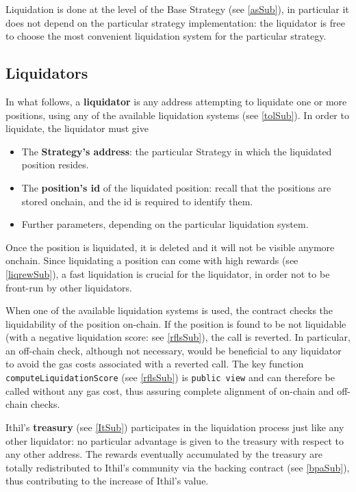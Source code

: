 \documentclass[a4paper,10 pt]{article}
\theoremstyle{definition}
\begin{document}
Liquidation is done at the level of the Base Strategy (see \ref{asSub}), in particular it does not depend on the particular strategy implementation: the liquidator is free to choose the most convenient liquidation system for the particular strategy.

\subsection{Liquidators}\label{liqSub}
In what follows, a {\bf liquidator} is any address attempting to liquidate one or more positions, using any of the available liquidation systems (see \ref{tolSub}). In order to liquidate, the liquidator must give
\begin{itemize}
\item The {\bf Strategy's address}: the particular Strategy in which the liquidated position resides.
\item The {\bf position's id} of the liquidated position: recall that the positions are stored onchain, and the id is required to identify them.
\item Further parameters, depending on the particular liquidation system.
\end{itemize}

Once the position is liquidated, it is deleted and it will not be visible anymore onchain. Since liquidating a position can come with high rewards (see \ref{liqrewSub}), a fast liquidation is crucial for the liquidator, in order not to be front-run by other liquidators.

When one of the available liquidation systems is used, the contract checks the liquidability of the position on-chain. If the position is found to be not liquidable (with a negative liquidation score: see \ref{rflsSub}), the call is reverted. In particular, an off-chain check, although not necessary, would be beneficial to any liquidator to avoid the gas costs associated with a reverted call. The key function \verb|computeLiquidationScore| (see \ref{rflsSub}) is \verb|public view| and can therefore be called without any gas cost, thus assuring complete alignment of on-chain and off-chain checks.

Ithil's {\bf treasury} (see \ref{ItSub}) participates in the liquidation process just like any other liquidator: no particular advantage is given to the treasury with respect to any other address. The rewards eventually accumulated by the treasury are totally redistributed to Ithil's community via the backing contract (see \ref{bpaSub}), thus contributing to the increase of Ithil's value.
\end{document}
